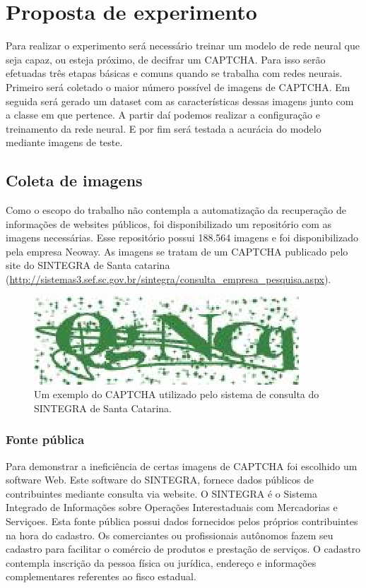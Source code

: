 \chapter{Proposta de experimento}

Para realizar o experimento será necessário treinar um modelo de rede
neural que seja capaz, ou esteja próximo, de decifrar um CAPTCHA. Para
isso serão efetuadas três etapas básicas e comuns quando se trabalha
com redes neurais. Primeiro será coletado o maior número possível de
imagens de CAPTCHA. Em seguida será gerado um dataset com as
características dessas imagens junto com a classe em que pertence. A
partir daí podemos realizar a configuração e treinamento da rede
neural. E por fim será testada a acurácia do modelo mediante imagens
de teste.

\section{Coleta de imagens}

Como o escopo do trabalho não contempla a automatização da recuperação
de informações de websites públicos, foi disponibilizado um
repositório com as imagens necessárias. Esse repositório possui
188.564 imagens e foi disponibilizado pela empresa Neoway. As imagens
se tratam de um CAPTCHA publicado pelo site do SINTEGRA de Santa
catarina
(\url{http://sistemas3.sef.sc.gov.br/sintegra/consulta_empresa_pesquisa.aspx}).

\begin{figure}[H]
\centering
\includegraphics[scale=1]{imagens/exemplo_captcha}
\caption{Um exemplo do CAPTCHA utilizado pelo sistema de consulta do
  SINTEGRA de Santa Catarina.}
\label{fig:gradient_descent}
\end{figure}


\subsection{Fonte pública}

Para demonstrar a ineficiência de certas imagens de CAPTCHA foi
escolhido um software Web. Este software do SINTEGRA, fornece dados
públicos de contribuintes mediante consulta via website. O SINTEGRA é
o Sistema Integrado de Informações sobre Operações Interestaduais com
Mercadorias e Serviçoes. Esta fonte pública possui dados fornecidos
pelos próprios contribuintes na hora do cadastro. Os comerciantes ou
profissionais autônomos fazem seu cadastro para facilitar o comércio
de produtos e prestação de serviços. O cadastro contempla inscrição da
pessoa física ou jurídica, endereço e informações complementares
referentes ao fisco estadual.

